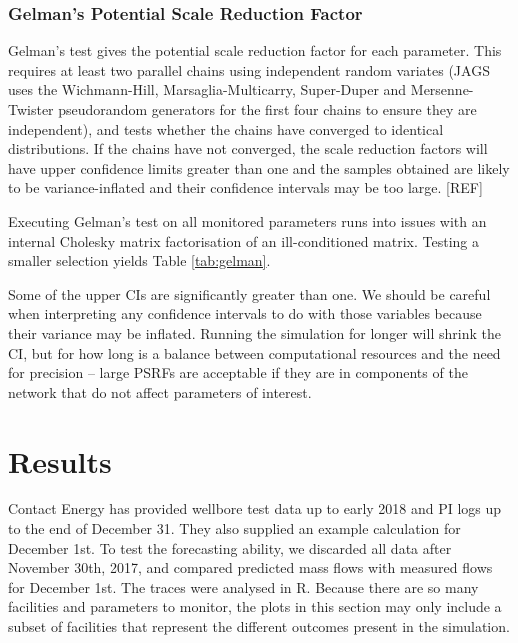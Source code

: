 \documentclass[a4paper, 12pt]{article}
\begin{document}
\subsubsection{Gelman's Potential Scale Reduction Factor}
Gelman's test gives the potential scale reduction factor for each parameter. This requires at least two parallel chains using independent random variates (JAGS uses the Wichmann-Hill, Marsaglia-Multicarry, Super-Duper and Mersenne-Twister pseudorandom generators for the first four chains to ensure they are independent), and tests whether the chains have converged to identical distributions. If the chains have not converged, the scale reduction factors will have upper confidence limits greater than one and the samples obtained are likely to be variance-inflated and their confidence intervals may be too large. [REF]

Executing Gelman's test on all monitored parameters runs into issues with an internal Cholesky matrix factorisation of an ill-conditioned matrix. Testing a smaller selection yields Table \ref{tab:gelman}.



Some of the upper CIs are significantly greater than one. We should be careful when interpreting any confidence intervals to do with those variables because their variance may be inflated. Running the simulation for longer will shrink the CI, but for how long is a balance between computational resources and the need for precision -- large PSRFs are acceptable if they are in components of the network that do not affect parameters of interest.

\section{Results}
Contact Energy has provided wellbore test data up to early 2018 and PI logs up to the end of December 31. They also supplied an example calculation for December 1st. To test the forecasting ability, we discarded all data after November 30th, 2017, and compared predicted mass flows with measured flows for December 1st. The traces were analysed in R. Because there are so many facilities and parameters to monitor, the plots in this section may only include a subset of facilities that represent the different outcomes present in the simulation.
\end{document}
